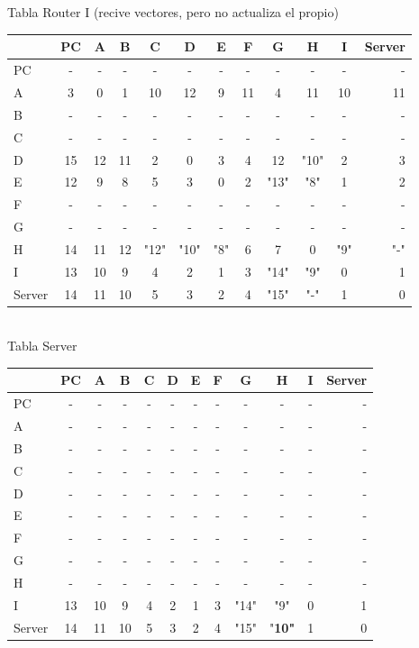 \documentclass{article}
\begin{document}
\\
\\
Tabla Router I (recive vectores, pero no actualiza el propio)\\
\begin{tabular}{l*{10}{c}r}
              & PC & A & B & C & D & E & F & G & H & I & Server \\
\hline
PC             & - & - & - & - & - & - & - & - & - & - & -\\
A              & 3 & 0 & 1 & 10 & 12 & 9 & 11 & 4 & 11 & 10 & 11 \\
B              & - & - & - & - & - & - & - & - & - & - & -\\
C              & - & - & - & - & - & - & - & - & - & - & -\\
D              & 15 & 12 & 11 & 2 & 0 & 3 & 4 & 12 & "10" & 2 & 3\\
E              & 12 & 9 & 8 & 5 & 3 & 0 & 2 & "13" & "8" & 1 & 2\\
F              & - & - & - & - & - & - & - & - & - & - & -\\
G              & - & - & - & - & - & - & - & - & - & - & -\\
H              & 14 & 11 & 12 & "12" & "10" & "8" & 6 & 7 & 0 & "9" & "-"\\
I              & 13 & 10 & 9 & 4 & 2 & 1 & 3 & "14" & "9" & 0 & 1\\
Server         & 14 & 11 & 10 & 5 & 3 & 2 & 4 & "15" & "-" & 1 & 0\\

\end{tabular}
\\
Tabla Server \\
\begin{tabular}{l*{10}{c}r}
              & PC & A & B & C & D & E & F & G & H & I & Server \\
\hline
PC             & - & - & - & - & - & - & - & - & - & - & -\\
A              & - & - & - & - & - & - & - & - & - & - & -\\
B              & - & - & - & - & - & - & - & - & - & - & -\\
C              & - & - & - & - & - & - & - & - & - & - & -\\
D              & - & - & - & - & - & - & - & - & - & - & -\\
E              & - & - & - & - & - & - & - & - & - & - & -\\
F              & - & - & - & - & - & - & - & - & - & - & -\\
G              & - & - & - & - & - & - & - & - & - & - & -\\
H              & - & - & - & - & - & - & - & - & - & - & -\\
I              & 13 & 10 & 9 & 4 & 2 & 1 & 3 & "14" & "9" & 0 & 1\\
Server         & 14& 11 & 10 &5& 3 & 2 & 4 &"15"& "\bf{10}" & 1 & 0\\

\end{tabular}
\end{document}
